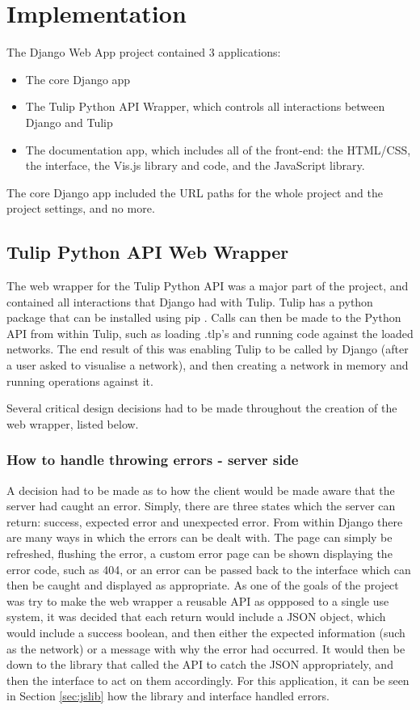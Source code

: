 \documentclass[../dissertation.tex]{subfiles}
\begin{document}
\chapter{Implementation}

The Django Web App project contained 3 applications: 

\begin{itemize}
    \item The core Django app
    \item The Tulip Python API Wrapper, which controls all interactions between Django and Tulip
    \item The documentation app, which includes all of the front-end: the HTML/CSS, the interface, the Vis.js library and code, and the JavaScript library.
\end{itemize}

The core Django app included the URL paths for the whole project and the project settings, and no more.

\section{Tulip Python API Web Wrapper}

The web wrapper for the Tulip Python API was a major part of the project, and contained all interactions that Django had with Tulip. Tulip has a python package \cite{tulippip} that can be installed using pip \cite{pip}. Calls can then be made to the Python API from within Tulip, such as loading .tlp's and running code against the loaded networks. The end result of this was enabling Tulip to be called by Django (after a user asked to visualise a network), and then creating a network in memory and running operations against it. 

Several critical design decisions had to be made throughout the creation of the web wrapper, listed below.

\subsection{How to handle throwing errors - server side}

A decision had to be made as to how the client would be made aware that the server had caught an error. Simply, there are three states which the server can return: success, expected error and unexpected error. From within Django there are many ways in which the errors can be dealt with. The page can simply be refreshed, flushing the error, a custom error page can be shown displaying the error code, such as 404, or an error can be passed back to the interface which can then be caught and displayed as appropriate. As one of the goals of the project was try to make the web wrapper a reusable API as oppposed to a single use system, it was decided that each return would include a JSON object, which would include a success boolean, and then either the expected information (such as the network) or a message with why the error had occurred. It would then be down to the library that called the API to catch the JSON appropriately, and then the interface to act on them accordingly. For this application, it can be seen in Section \ref{sec:jslib} how the library and interface handled errors.
\end{document}
